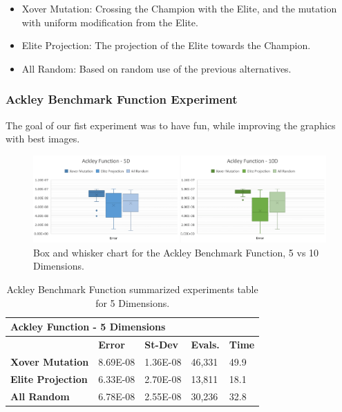 \documentclass[graybox]{svmult}
\begin{document}
\begin{itemize}
    \item   Xover Mutation:      Crossing the Champion with the Elite, and the mutation with uniform modification from the Elite.
    \item   Elite Projection:    The projection of the Elite towards the Champion. 
    \item   All Random:          Based on random use of the previous alternatives.
\end{itemize}

\subsubsection{Ackley Benchmark Function Experiment}

The goal of our fist experiment was to have fun, while improving the graphics with best images.

\begin{figure}
    \includegraphics[width=\linewidth, frame]{img/fig_fun_ackley.pdf}
    \caption{Box and whisker chart for the Ackley Benchmark Function, 5 vs 10 Dimensions.} \label{fig.fun_ackley}
    \end{figure}

\begin{table}[]
    \scriptsize
    \centering
    \caption{Ackley Benchmark Function summarized experiments table for 5 Dimensions.}\label{tab.fun_ackley5}
    \begin{tabular}{@{}lllll@{}}
    \toprule
    \multicolumn{5}{l}{\textbf{Ackley Function - 5 Dimensions}} \\ \midrule
     & \textbf{Error} & \textbf{St-Dev} & \textbf{Evals.} & \textbf{Time} \\
    \textbf{Xover Mutation} & 8.69E-08 & 1.36E-08 & 46,331 & 49.9 \\
    \textbf{Elite Projection} & 6.33E-08 & 2.70E-08 & 13,811 & 18.1 \\
    \textbf{All Random} & 6.78E-08 & 2.55E-08 & 30,236 & 32.8 \\ \bottomrule
    \end{tabular}
    \end{table}
\end{document}
